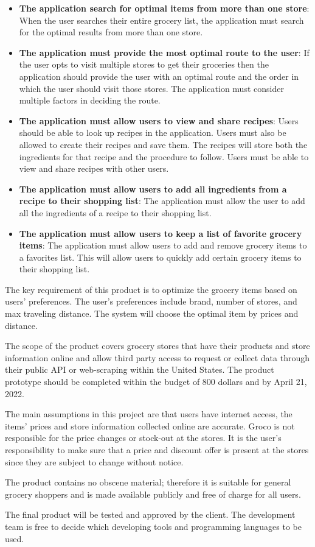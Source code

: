 \begin{itemize}
\item \textbf{The application search for optimal items from more than one store}: When the user searches their entire grocery list, the application must search for the optimal results from more than one store.

\item \textbf{The application must provide the most optimal route to the user}: If the user opts to visit multiple stores to get their groceries then the application should provide the user with an optimal route and the order in which the user should visit those stores. The application must consider multiple factors in deciding the route.

\item \textbf{The application must allow users to view and share recipes}: Users should be able to look up recipes in the application. Users must also be allowed to create their recipes and save them. The recipes will store both the ingredients for that recipe and the procedure to follow. Users must be able to view and share recipes with other users.

\item \textbf{The application must allow users to add all ingredients from a recipe to their shopping list}: The application must allow the user to add all the ingredients of a recipe to their shopping list.

\item \textbf{The application must allow users to keep a list of favorite grocery items}: The application must allow users to add and remove grocery items to a favorites list. This will allow users to quickly add certain grocery items to their shopping list.

\end{itemize} 

The key requirement of this product is to optimize the grocery items based on users' preferences. The user's preferences include brand, number of stores, and max traveling distance. The system will choose the optimal item by prices and distance.  

The scope of the product covers grocery stores that have their products and store information online and allow third party access to request or collect data through their public API or web-scraping within the United States. The product prototype should be completed within the budget of 800 dollars and by April 21, 2022.

The main assumptions in this project are that users have internet access, the items' prices and store information collected online are accurate. Groco is not responsible for the price changes or stock-out at the stores. It is the user's responsibility to make sure that a price and discount offer is present at the stores since they are subject to change without notice.

The product contains no obscene material; therefore it is suitable for general grocery shoppers and is made available publicly and free of charge for all users.

The final product will be tested and approved by the client. The development team is free to decide which developing tools and programming languages to be used.


